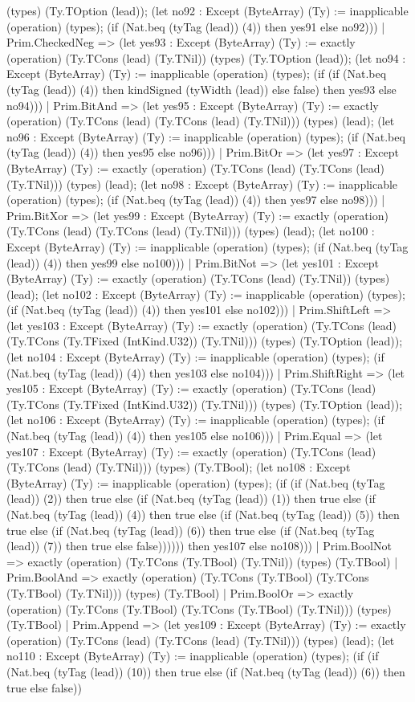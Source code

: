 \documentclass[11pt]{article}
\begin{document}
(types) (Ty.TOption (lead)); (let no92 : Except (ByteArray) (Ty) := inapplicable (operation) (types); (if (Nat.beq (tyTag (lead)) (4)) then yes91 else no92))) | Prim.CheckedNeg => (let yes93 : Except (ByteArray) (Ty) := exactly (operation) (Ty.TCons (lead) (Ty.TNil)) (types) (Ty.TOption (lead)); (let no94 : Except (ByteArray) (Ty) := inapplicable (operation) (types); (if (if (Nat.beq (tyTag (lead)) (4)) then kindSigned (tyWidth (lead)) else false) then yes93 else no94))) | Prim.BitAnd => (let yes95 : Except (ByteArray) (Ty) := exactly (operation) (Ty.TCons (lead) (Ty.TCons (lead) (Ty.TNil))) (types) (lead); (let no96 : Except (ByteArray) (Ty) := inapplicable (operation) (types); (if (Nat.beq (tyTag (lead)) (4)) then yes95 else no96))) | Prim.BitOr => (let yes97 : Except (ByteArray) (Ty) := exactly (operation) (Ty.TCons (lead) (Ty.TCons (lead) (Ty.TNil))) (types) (lead); (let no98 : Except (ByteArray) (Ty) := inapplicable (operation) (types); (if (Nat.beq (tyTag (lead)) (4)) then yes97 else no98))) | Prim.BitXor => (let yes99 : Except (ByteArray) (Ty) := exactly (operation) (Ty.TCons (lead) (Ty.TCons (lead) (Ty.TNil))) (types) (lead); (let no100 : Except (ByteArray) (Ty) := inapplicable (operation) (types); (if (Nat.beq (tyTag (lead)) (4)) then yes99 else no100))) | Prim.BitNot => (let yes101 : Except (ByteArray) (Ty) := exactly (operation) (Ty.TCons (lead) (Ty.TNil)) (types) (lead); (let no102 : Except (ByteArray) (Ty) := inapplicable (operation) (types); (if (Nat.beq (tyTag (lead)) (4)) then yes101 else no102))) | Prim.ShiftLeft => (let yes103 : Except (ByteArray) (Ty) := exactly (operation) (Ty.TCons (lead) (Ty.TCons (Ty.TFixed (IntKind.U32)) (Ty.TNil))) (types) (Ty.TOption (lead)); (let no104 : Except (ByteArray) (Ty) := inapplicable (operation) (types); (if (Nat.beq (tyTag (lead)) (4)) then yes103 else no104))) | Prim.ShiftRight => (let yes105 : Except (ByteArray) (Ty) := exactly (operation) (Ty.TCons (lead) (Ty.TCons (Ty.TFixed (IntKind.U32)) (Ty.TNil))) (types) (Ty.TOption (lead)); (let no106 : Except (ByteArray) (Ty) := inapplicable (operation) (types); (if (Nat.beq (tyTag (lead)) (4)) then yes105 else no106))) | Prim.Equal => (let yes107 : Except (ByteArray) (Ty) := exactly (operation) (Ty.TCons (lead) (Ty.TCons (lead) (Ty.TNil))) (types) (Ty.TBool); (let no108 : Except (ByteArray) (Ty) := inapplicable (operation) (types); (if (if (Nat.beq (tyTag (lead)) (2)) then true else (if (Nat.beq (tyTag (lead)) (1)) then true else (if (Nat.beq (tyTag (lead)) (4)) then true else (if (Nat.beq (tyTag (lead)) (5)) then true else (if (Nat.beq (tyTag (lead)) (6)) then true else (if (Nat.beq (tyTag (lead)) (7)) then true else false)))))) then yes107 else no108))) | Prim.BoolNot => exactly (operation) (Ty.TCons (Ty.TBool) (Ty.TNil)) (types) (Ty.TBool) | Prim.BoolAnd => exactly (operation) (Ty.TCons (Ty.TBool) (Ty.TCons (Ty.TBool) (Ty.TNil))) (types) (Ty.TBool) | Prim.BoolOr => exactly (operation) (Ty.TCons (Ty.TBool) (Ty.TCons (Ty.TBool) (Ty.TNil))) (types) (Ty.TBool) | Prim.Append => (let yes109 : Except (ByteArray) (Ty) := exactly (operation) (Ty.TCons (lead) (Ty.TCons (lead) (Ty.TNil))) (types) (lead); (let no110 : Except (ByteArray) (Ty) := inapplicable (operation) (types); (if (if (Nat.beq (tyTag (lead)) (10)) then true else (if (Nat.beq (tyTag (lead)) (6)) then true else false)) 
\end{document}
